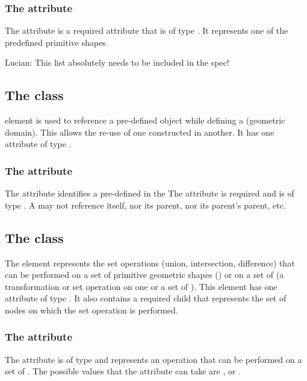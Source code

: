 \subsubsection{The  attribute}
The  attribute is a required attribute that is of type . It represents one of the predefined primitive shapes.

{\color{red} Lucian: \notice This list absolutely needs to be included in the spec!}


\subsection{The  class}
\label{CSGPseudoPrimitive-class}
\CSGPseudoPrimitive element is used to reference a pre-defined \CSGObject object while defining a \CSGObject (geometric domain). This allows the re-use of one constructed \CSGObject in another. It has one attribute of type .

\subsubsection{The  attribute}
The  attribute identifies a pre-defined \CSGObject in the \CSGeometry The attribute is required and is of type .  A \CSGObject may not reference itself, nor its parent, nor its parent's parent, etc.


\subsection{The  class}
\label{CSGSetOperator-class}
The \CSGSetOperator element represents the set operations (union, intersection, difference) that can be performed on a set of primitive geometric shapes (\CSGPrimitives) or on a set of \CSGNodes (a transformation or set operation on one or a set of \CSGPrimitives). This element has one attribute of type . It also contains a required child \ListOfCSGNodes that represents the set of nodes on which the set operation is performed.

\subsubsection{The  attribute}
The  attribute is of type  and represents an operation that can be performed on a set of \CSGNodes. The possible values that the  attribute can take are ,  or .

